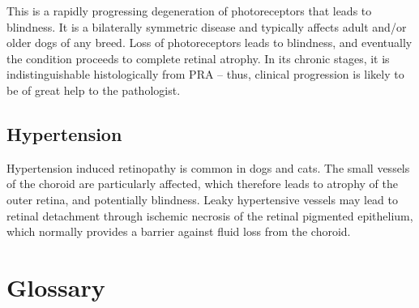 \documentclass[
  openany]{article}
\begin{document}
This is a rapidly progressing degeneration of photoreceptors that leads to blindness. It is a bilaterally symmetric disease and typically affects adult and/or older dogs of any breed. Loss of photoreceptors leads to blindness, and eventually the condition proceeds to complete retinal atrophy. In its chronic stages, it is indistinguishable histologically from PRA -- thus, clinical progression is likely to be of great help to the pathologist.

\hypertarget{hypertension}{%
\subsection{Hypertension}\label{hypertension}}

Hypertension induced retinopathy is common in dogs and cats. The small vessels of the choroid are particularly affected, which therefore leads to atrophy of the outer retina, and potentially blindness. Leaky hypertensive vessels may lead to retinal detachment through ischemic necrosis of the retinal pigmented epithelium, which normally provides a barrier against fluid loss from the choroid.

\hypertarget{glossary}{%
\section{Glossary}\label{glossary}}
\end{document}
